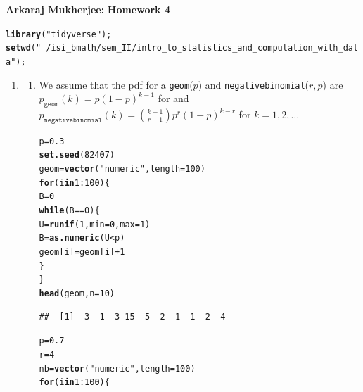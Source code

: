 \documentclass[11pt]{article}\usepackage[]{graphicx}\usepackage[dvipsnames]{xcolor}
\makeatletter
\newcommand{\hlnum}[1]{\textcolor[rgb]{0.686,0.059,0.569}{#1}}%
\newcommand{\hlsng}[1]{\textcolor[rgb]{0.192,0.494,0.8}{#1}}%
\newcommand{\hlopt}[1]{\textcolor[rgb]{0,0,0}{#1}}%
\newcommand{\hldef}[1]{\textcolor[rgb]{0.345,0.345,0.345}{#1}}%
\newcommand{\hlkwa}[1]{\textcolor[rgb]{0.161,0.373,0.58}{\textbf{#1}}}%
\newcommand{\hlkwb}[1]{\textcolor[rgb]{0.69,0.353,0.396}{#1}}%
\newcommand{\hlkwc}[1]{\textcolor[rgb]{0.333,0.667,0.333}{#1}}%
\newcommand{\hlkwd}[1]{\textcolor[rgb]{0.737,0.353,0.396}{\textbf{#1}}}%
\newenvironment{kframe}{%
 \def\at@end@of@kframe{}%
 \ifinner\ifhmode%
  \def\at@end@of@kframe{\end{minipage}}%
  \begin{minipage}{\columnwidth}%
 \fi\fi%
 \def\FrameCommand##1{\hskip\@totalleftmargin \hskip-\fboxsep
 \colorbox{shadecolor}{##1}\hskip-\fboxsep
     \hskip-\linewidth \hskip-\@totalleftmargin \hskip\columnwidth}%
 \MakeFramed {\advance\hsize-\width
   \@totalleftmargin\z@ \linewidth\hsize
   \@setminipage}}%
 {\par\unskip\endMakeFramed%
 \at@end@of@kframe}
\newenvironment{knitrout}{}{} %
\theoremstyle{problemstyle}
\makeatother
\begin{document}
{\bf Arkaraj Mukherjee: }
{\bf Homework 4}
\\
\begin{knitrout}
\color{fgcolor}\begin{kframe}
\begin{alltt}
\hlkwd{library}\hldef{(}\hlsng{"tidyverse"}\hldef{);}
\hlkwd{setwd}\hldef{(}\hlsng{"~/isi_bmath/sem_II/intro_to_statistics_and_computation_with_data"}\hldef{);}
\end{alltt}
\end{kframe}
\end{knitrout}

\begin{enumerate}[label=\arabic*.]
    \item
    \begin{enumerate}[label=(\alph*)]
\item We assume that the pdf for a \texttt{geom}($p$) and \texttt{negativebinomial}($r,p$) are $p_{\texttt{geom}}(k)=p(1-p)^{k-1}$ for and $p_{\texttt{negativebinomial}}(k)=\binom{k-1}{r-1}p^r(1-p)^{k-r}$ for $k=1,2,\ldots$
\begin{knitrout}
\color{fgcolor}\begin{kframe}
\begin{alltt}
\hldef{p} \hlkwb{=} \hlnum{0.3}
\hlkwd{set.seed}\hldef{(}\hlnum{82407}\hldef{)}
\hldef{geom} \hlkwb{=} \hlkwd{vector}\hldef{(}\hlsng{"numeric"}\hldef{,} \hlkwc{length} \hldef{=} \hlnum{100}\hldef{)}
\hlkwa{for}\hldef{(i} \hlkwa{in} \hlnum{1}\hlopt{:}\hlnum{100}\hldef{) \{}
    \hldef{B} \hlkwb{=} \hlnum{0}
    \hlkwa{while}\hldef{(B} \hlopt{==} \hlnum{0}\hldef{) \{}
        \hldef{U} \hlkwb{=} \hlkwd{runif}\hldef{(}\hlnum{1}\hldef{,} \hlkwc{min} \hldef{=} \hlnum{0}\hldef{,} \hlkwc{max} \hldef{=} \hlnum{1}\hldef{)}
        \hldef{B} \hlkwb{=} \hlkwd{as.numeric}\hldef{(U}\hlopt{<}\hldef{p)}
        \hldef{geom[i]} \hlkwb{=} \hldef{geom[i]} \hlopt{+} \hlnum{1}
    \hldef{\}}
\hldef{\}}
\hlkwd{head}\hldef{(geom,} \hlkwc{n} \hldef{=} \hlnum{10}\hldef{)}
\end{alltt}
\begin{verbatim}
##  [1]  3  1  3 15  5  2  1  1  2  4
\end{verbatim}
\begin{alltt}
\hldef{p} \hlkwb{=} \hlnum{0.7}
\hldef{r} \hlkwb{=} \hlnum{4}
    \hldef{nb} \hlkwb{=} \hlkwd{vector}\hldef{(}\hlsng{"numeric"}\hldef{,} \hlkwc{length} \hldef{=} \hlnum{100}\hldef{)}
    \hlkwa{for}\hldef{(i} \hlkwa{in} \hlnum{1}\hlopt{:}\hlnum{100}\hldef{) \{}

\end{alltt}
\end{kframe}
\end{knitrout}
\end{enumerate}
\end{enumerate}
\end{document}
